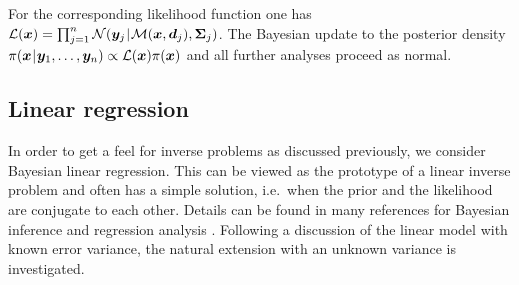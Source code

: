 For the corresponding likelihood function one has \(\mathcal{L}(\bm{x}) = \prod_{j=1}^n \mathcal{N}(\bm{y}_j {\:\!}|{\:\!} \mathcal{M}(\bm{x},\bm{d}_j),\bm{\Sigma}_j)\).
The Bayesian update to the posterior density \(\pi(\bm{x} {\:\!}|{\:\!} \bm{y}_1,\ldots,\bm{y}_n) \propto \mathcal{L}(\bm{x}) \pi(\bm{x})\) and all further analyses proceed as normal.

\subsection{Linear regression} \label{sec:Bayesian:InverseProblems:LinearRegression}
In order to get a feel for inverse problems as discussed previously, we consider Bayesian linear regression.
This can be viewed as the prototype of a linear inverse problem and often has a simple solution, i.e.\ when the prior and the likelihood are conjugate to each other.
Details can be found in many references for Bayesian inference \cite{Bayesian:OHagan1994,Bayesian:Hoff2009} and regression analysis \cite{Statistics:Seber2003,Statistics:Yan2009}.
Following a discussion of the linear model with known error variance, the natural extension with an unknown variance is investigated.

